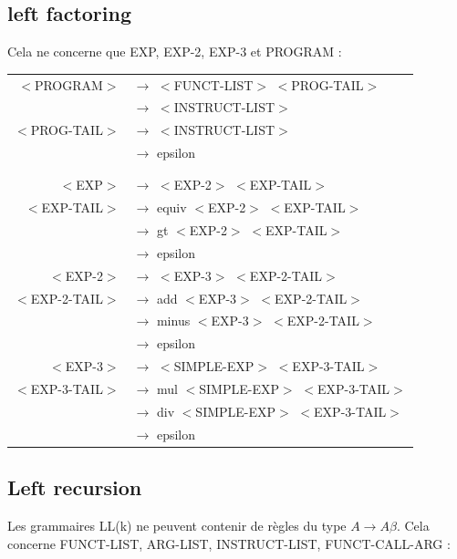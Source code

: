 \documentclass[a4paper,10pt]{article}
\begin{document}
\subsection{left factoring}
	Cela ne concerne que EXP, EXP-2, EXP-3 et PROGRAM : \\
	\begin{center}\begin{tabular}{rl}
		$<$PROGRAM$>$		& $\rightarrow$ $<$FUNCT-LIST$>$ $<$PROG-TAIL$>$\\
							& $\rightarrow$ $<$INSTRUCT-LIST$>$\\
		$<$PROG-TAIL$>$		& $\rightarrow$ $<$INSTRUCT-LIST$>$\\
							& $\rightarrow$ epsilon\\
							&\\
							&\\
		$<$EXP$>$			& $\rightarrow$ $<$EXP-2$>$ $<$EXP-TAIL$>$ \\

		$<$EXP-TAIL$>$		& $\rightarrow$ equiv $<$EXP-2$>$ $<$EXP-TAIL$>$\\
							& $\rightarrow$ gt $<$EXP-2$>$ $<$EXP-TAIL$>$\\ 
							& $\rightarrow$ epsilon \\
					
		$<$EXP-2$>$			& $\rightarrow$ $<$EXP-3$>$ $<$EXP-2-TAIL$>$ \\

		$<$EXP-2-TAIL$>$	& $\rightarrow$ add $<$EXP-3$>$ $<$EXP-2-TAIL$>$\\
							& $\rightarrow$ minus $<$EXP-3$>$ $<$EXP-2-TAIL$>$\\ 
							& $\rightarrow$ epsilon \\
					
		$<$EXP-3$>$			& $\rightarrow$ $<$SIMPLE-EXP$>$ $<$EXP-3-TAIL$>$ \\

		$<$EXP-3-TAIL$>$	& $\rightarrow$ mul $<$SIMPLE-EXP$>$ $<$EXP-3-TAIL$>$\\
							& $\rightarrow$ div $<$SIMPLE-EXP$>$ $<$EXP-3-TAIL$>$\\ 
							& $\rightarrow$ epsilon \\				
	\end{tabular}\end{center}

\subsection{Left recursion}
	Les grammaires LL(k) ne peuvent contenir de règles du type $A \rightarrow A \beta$. Cela concerne FUNCT-LIST, ARG-LIST, INSTRUCT-LIST, FUNCT-CALL-ARG : \\
\end{document}
